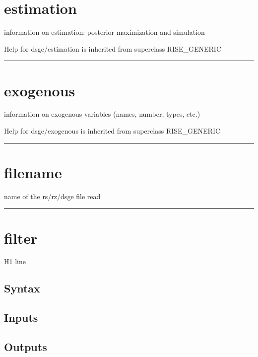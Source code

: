 \documentclass[letterpaper,10pt,english]{sphinxmanual}
\begin{document}
\section{estimation}
\label{classes/models/@dsge/dsge:estimation}\label{classes/models/@dsge/dsge:id43}
information on estimation: posterior maximization and simulation

Help for dsge/estimation is inherited from superclass RISE\_GENERIC


\bigskip\hrule{}\bigskip



\section{exogenous}
\label{classes/models/@dsge/dsge:id44}\label{classes/models/@dsge/dsge:exogenous}
information on exogenous variables (names, number, types, etc.)

Help for dsge/exogenous is inherited from superclass RISE\_GENERIC


\bigskip\hrule{}\bigskip



\section{filename}
\label{classes/models/@dsge/dsge:id45}\label{classes/models/@dsge/dsge:filename}
name of the rs/rz/dsge file read


\bigskip\hrule{}\bigskip



\section{filter}
\label{classes/models/@dsge/dsge:filter}\label{classes/models/@dsge/dsge:id46}
H1 line


\subsection{Syntax}
\label{classes/models/@dsge/dsge:id47}

\subsection{Inputs}
\label{classes/models/@dsge/dsge:id48}

\subsection{Outputs}
\label{classes/models/@dsge/dsge:id49}
\end{document}
